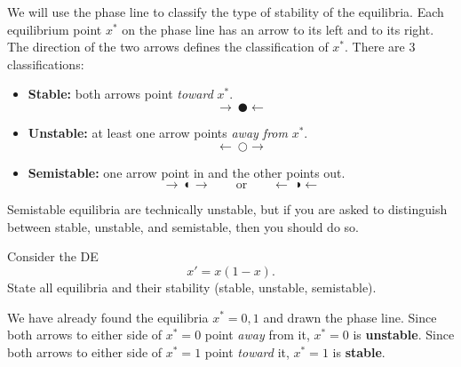 \documentclass[09pt,letterpaper]{article}
\begin{document}
We will use the phase line to classify the type of stability of the equilibria. Each equilibrium point $x^*$ on the phase line has an arrow to its left and to its right. The direction of the two arrows defines the classification of $x^*$. There are 3 classifications:
\begin{itemize}
    \item \textbf{Stable:} both arrows point \emph{toward} $x^*$.
    \[
    \longrightarrow\ \CIRCLE \longleftarrow
    \]
    \item \textbf{Unstable:} at least one arrow points \emph{away from} $x^*$.
    \[
    \longleftarrow\ \Circle \longrightarrow
    \]
    \item \textbf{Semistable:} one arrow point in and the other points out.
    \[
    \longrightarrow\ \LEFTcircle \longrightarrow
    \qquad\text{or}\qquad
    \longleftarrow\ \RIGHTcircle  \longleftarrow
    \]
\end{itemize}
Semistable equilibria are technically unstable, but if you are asked to distinguish between stable, unstable, and semistable, then you should do so. 

\begin{example}[6]{
Consider the DE 
$$x' = x(1-x).$$
State all equilibria and their stability (stable, unstable, semistable). }

We have already found the equilibria $x^*=0,1$ and drawn the phase line. Since both arrows to either side of $x^*=0$ point \textit{away} from it, $x^*=0$ is \textbf{unstable}. Since both arrows to either side of $x^*=1$ point \textit{toward} it, $x^*=1$ is \textbf{stable}.

\begin{figure}[H]
    \centering
{}
\end{figure}
\end{example}
\end{document}
